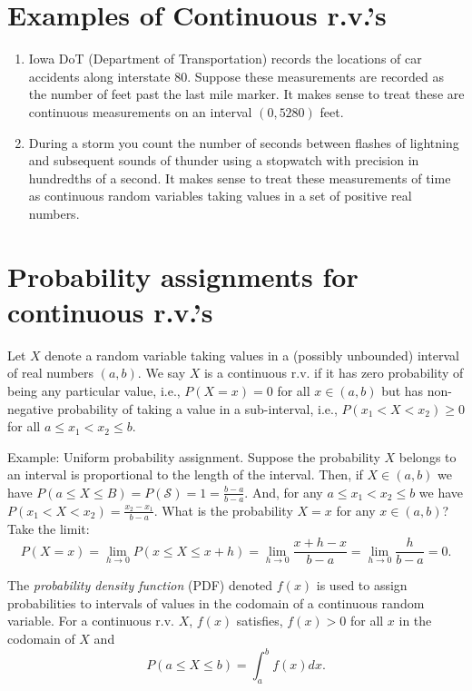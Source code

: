 \documentclass[
]{book}
\begin{document}
\hypertarget{examples-of-continuous-r.v.s}{%
\section{Examples of Continuous r.v.'s}\label{examples-of-continuous-r.v.s}}

\begin{enumerate}
\def\labelenumi{\arabic{enumi}.}
\item
  Iowa DoT (Department of Transportation) records the locations of car accidents along interstate 80. Suppose these measurements are recorded as the number of feet past the last mile marker. It makes sense to treat these are continuous measurements on an interval \((0,5280)\) feet.
\item
  During a storm you count the number of seconds between flashes of lightning and subsequent sounds of thunder using a stopwatch with precision in hundredths of a second. It makes sense to treat these measurements of time as continuous random variables taking values in a set of positive real numbers.
\end{enumerate}

\hypertarget{probability-assignments-for-continuous-r.v.s}{%
\section{Probability assignments for continuous r.v.'s}\label{probability-assignments-for-continuous-r.v.s}}

Let \(X\) denote a random variable taking values in a (possibly unbounded) interval of real numbers \((a,b)\). We say \(X\) is a continuous r.v. if it has zero probability of being any particular value, i.e., \(P(X=x) = 0\) for all \(x \in (a,b)\) but has non-negative probability of taking a value in a sub-interval, i.e., \(P(x_1 < X <x_2) \geq 0\) for all \(a\leq x_1 < x_2\leq b\).

Example: Uniform probability assignment. Suppose the probability \(X\) belongs to an interval is proportional to the length of the interval. Then, if \(X \in (a,b)\) we have \(P(a \leq X \leq B) = P(\mathcal{S}) = 1 = \frac{b-a}{b-a}\). And, for any \(a\leq x_1 < x_2\leq b\) we have \(P(x_1 < X < x_2) = \frac{x_2 - x_1}{b-a}\). What is the probability \(X = x\) for any \(x \in (a,b)\)? Take the limit:
\[P(X = x) = \lim_{h\rightarrow 0} P(x \leq X \leq x+h) = \lim_{h\rightarrow 0}\frac{x+h - x}{b-a} = \lim_{h\rightarrow 0}\frac{h}{b-a} = 0.\]

The \emph{probability density function} (PDF) denoted \(f(x)\) is used to assign probabilities to intervals of values in the codomain of a continuous random variable. For a continuous r.v. \(X\), \(f(x)\) satisfies, \(f(x)>0\) for all \(x\) in the codomain of \(X\) and
\[P(a\leq X\leq b) = \int_a^b f(x)dx.\]
\end{document}
